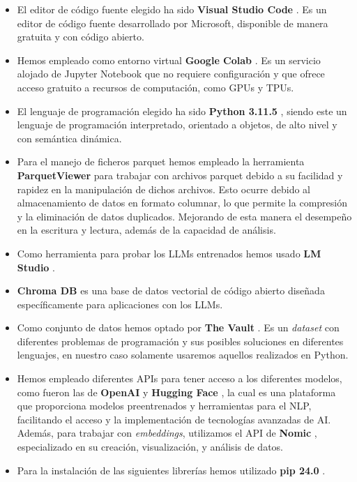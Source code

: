 \begin{itemize}
    \item El editor de código fuente elegido ha sido \textbf{Visual Studio Code} \cite{VSC}. Es un editor de código fuente desarrollado por Microsoft, disponible de manera gratuita y con código abierto.
    \item Hemos empleado como entorno virtual \textbf{Google Colab} \cite{GoogleColab}. Es un servicio alojado de Jupyter Notebook que no requiere configuración y que ofrece acceso gratuito a recursos de computación, como GPUs y TPUs.
    \item El lenguaje de programación elegido ha sido \textbf{Python 3.11.5} \cite{Python}, siendo este un lenguaje de programación interpretado, orientado a objetos, de alto nivel y con semántica dinámica.
    \item Para el manejo de ficheros parquet hemos empleado la herramienta \textbf{ParquetViewer}  para trabajar con archivos parquet \cite{GobiernoEspana_Parquet} debido a su facilidad y rapidez en la manipulación de dichos archivos. Esto ocurre debido al almacenamiento de datos en formato columnar, lo que permite la compresión y la eliminación de datos duplicados. Mejorando de esta manera el desempeño en la escritura y lectura, además de la capacidad de análisis.
    \item Como herramienta para probar los \acrlong{LLMs} entrenados hemos usado \textbf{LM Studio} \cite{LMStudio}.
    \item \textbf{Chroma DB} \cite{Chroma} es una base de datos vectorial de código abierto diseñada específicamente para aplicaciones con los \acrfull{LLMs}.
    \item Como conjunto de datos hemos optado por \textbf{The Vault} \cite{TheVault}. Es un \textit{dataset} con diferentes problemas de programación y sus posibles soluciones en diferentes lenguajes, en nuestro caso solamente usaremos aquellos realizados en Python.
    \item Hemos empleado diferentes \acrshort{API}s para tener acceso a los diferentes modelos, como fueron las de \textbf{OpenAI} \cite{APIOpenApi}y \textbf{Hugging Face} \cite{HuggingFace}, la cual es una plataforma que proporciona modelos preentrenados y herramientas para el \acrlong{NLP}, facilitando el acceso y la implementación de tecnologías avanzadas de \acrshort{AI}. Además, para trabajar con \textit{embeddings}, utilizamos el \acrshort{API} de \textbf{Nomic} \cite{Nomic}, especializado en su creación, visualización, y análisis de datos.    
    \item Para la instalación de las siguientes librerías hemos utilizado \textbf{pip 24.0} \cite{Pip}.

\end{itemize}
